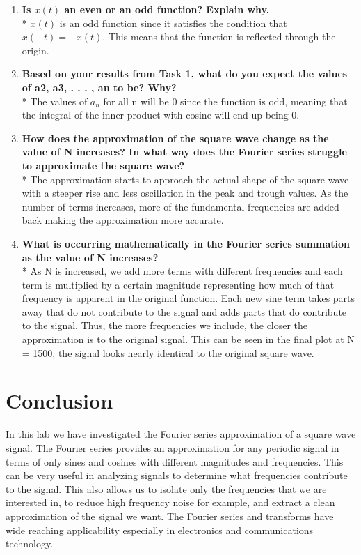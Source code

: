 \documentclass[12pt]{report}
\providecommand{\tightlist}{%
        \setlength{\itemsep}{0pt}\setlength{\parskip}{0pt}}
\def\br{\hspace*{\fill} \\* }
\begin{document}
\begin{enumerate}
\def\labelenumi{\arabic{enumi}.}
\tightlist
\item
  \textbf{Is \(x(t)\) an even or an odd function? Explain why.}
  \br \(x(t)\) is an odd function since it satisfies the condition that
  \(x(-t)=-x(t)\). This means that the function is reflected through the
  origin.
\item
  \textbf{Based on your results from Task 1, what do you expect the
  values of a2, a3, . . . , an to be? Why?} \br The values of \(a_n\)
  for all n will be 0 since the function is odd, meaning that the
  integral of the inner product with cosine will end up being 0.
\item
  \textbf{How does the approximation of the square wave change as the
  value of N increases? In what way does the Fourier series struggle to
  approximate the square wave?} \br The approximation starts to approach
  the actual shape of the square wave with a steeper rise and less
  oscillation in the peak and trough values. As the number of terms
  increases, more of the fundamental frequencies are added back making
  the approximation more accurate.
\item
  \textbf{What is occurring mathematically in the Fourier series
  summation as the value of N increases?} \br As N is increased, we add
  more terms with different frequencies and each term is multiplied by a
  certain magnitude representing how much of that frequency is apparent
  in the original function. Each new sine term takes parts away that do
  not contribute to the signal and adds parts that do contribute to the
  signal. Thus, the more frequencies we include, the closer the
  approximation is to the original signal. This can be seen in the final
  plot at N = 1500, the signal looks nearly identical to the original
  square wave.
\end{enumerate}

\hypertarget{conclusion}{%
\chapter{Conclusion}\label{conclusion}}

In this lab we have investigated the Fourier series approximation of a
square wave signal. The Fourier series provides an approximation for any
periodic signal in terms of only sines and cosines with different
magnitudes and frequencies. This can be very useful in analyzing signals
to determine what frequencies contribute to the signal. This also allows
us to isolate only the frequencies that we are interested in, to reduce
high frequency noise for example, and extract a clean approximation of
the signal we want. The Fourier series and transforms have wide reaching
applicability especially in electronics and communications technology.
\end{document}
